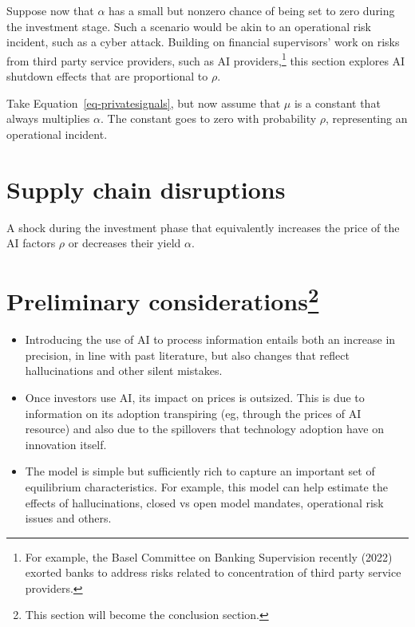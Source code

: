 \documentclass[
]{article}
\theoremstyle{plain}
\theoremstyle{remark}
\begin{document}
Suppose now that \(\alpha\) has a small but nonzero chance of being set
to zero during the investment stage. Such a scenario would be akin to an
operational risk incident, such as a cyber attack. Building on financial
supervisors' work on risks from third party service providers, such as
AI providers,\footnote{For example, the Basel Committee on Banking
  Supervision recently (2022) exorted banks to address risks related to
  concentration of third party service providers.} this section explores
AI shutdown effects that are proportional to \(\rho\).

Take Equation~\ref{eq-privatesignals}, but now assume that \(\mu\) is a
constant that always multiplies \(\alpha\). The constant goes to zero
with probability \(\rho\), representing an operational incident.

\section{Supply chain disruptions}\label{supply-chain-disruptions}

A shock during the investment phase that equivalently increases the
price of the AI factors \(\rho\) or decreases their yield \(\alpha\).

\section[Preliminary considerations]{\texorpdfstring{Preliminary
considerations\footnote{This section will become the conclusion section.}}{Preliminary considerations}}\label{preliminary-considerationsconcl}

\begin{itemize}
\item
  Introducing the use of AI to process information entails both an
  increase in precision, in line with past literature, but also changes
  that reflect hallucinations and other silent mistakes.
\item
  Once investors use AI, its impact on prices is outsized. This is due
  to information on its adoption transpiring (eg, through the prices of
  AI resource) and also due to the spillovers that technology adoption
  have on innovation itself.
\item
  The model is simple but sufficiently rich to capture an important set
  of equilibrium characteristics. For example, this model can help
  estimate the effects of hallucinations, closed vs open model mandates,
  operational risk issues and others.
\end{itemize}
\end{document}
